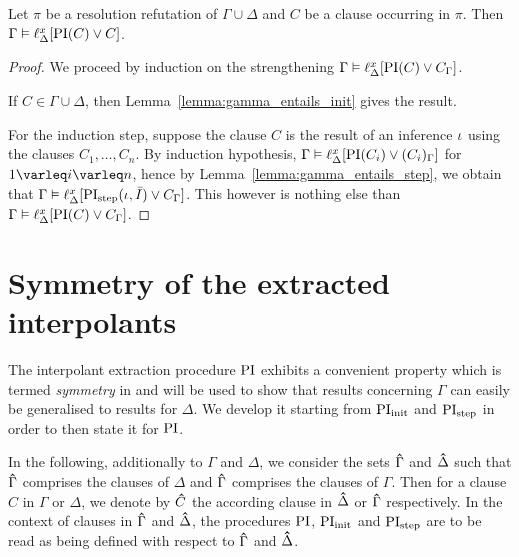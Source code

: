 \begin{lemma}
	\label{lemma:gamma_entails_lifted_interpolant}
	Let $\pi$ be a resolution refutation of $\Gamma \cup \Delta$ and $C$ be a clause occurring in $\pi$.
	Then $\Gamma \entails \lifdelta{\PI(C) \lor\nolinebreak C}$.
\end{lemma}
\begin{proof}
	We proceed by induction on the strengthening
	$\Gamma \entails \lifdelta{\PI(C) \lor\nolinebreak C_\Gamma}$.

	If $C \in \Gamma\cup\Delta$, then Lemma~\ref{lemma:gamma_entails_init} gives the result.

	For the induction step, suppose the clause $C$ is the result of an inference $\iota$ using the clauses $C_1, \dots, C_n$.
	By induction hypothesis, $\Gamma \entails \lifdelta{\PI(C_i) \lor\nolinebreak (C_i)_\Gamma}$ for $1\varleq i\varleq n$, hence
	by Lemma~\ref{lemma:gamma_entails_step}, we obtain that 
	$\Gamma \vDash \ell_{\Delta}^{x}[\operatorname{PI}_{\mathrm{step}}(\iota, \bar I) \lor C_\Gamma]$.
	This however is nothing else than $\Gamma \vDash \ell_{\Delta}^{x}[\operatorname{PI}(C) \lor C_\Gamma]$.
\end{proof}




\section{Symmetry of the extracted interpolants}
\label{sec:symmetry}

The interpolant extraction procedure $\operatorname{PI}$ exhibits a convenient property which is termed \emph{symmetry} in \cite[Definition 3]{interpolantStrenth} and will be used to show that results concerning $\Gamma$ can easily be generalised to results for $\Delta$.
We develop it starting from $\operatorname{PI}_{\mathrm{init}}$ and $\operatorname{PI}_{\mathrm{step}}$ in order to then state it for $\operatorname{PI}$. 

\newcommand{\primex}[1]{\ensuremath{\bhat{#1}}}

In the following, additionally to $\Gamma$ and $\Delta$, we consider the sets $\primex{\Gamma}$ and $\primex{\Delta}$ such that $\primex{\Gamma}$ comprises the clauses of $\Delta$ and $\primex{\Gamma}$ comprises the clauses of $\Gamma$. 
Then for a clause $C$ in $\Gamma$ or $\Delta$, we denote by $\primex C$ the according clause in $\primex \Delta$ or $\primex \Gamma$ respectively.
In the context of clauses in $\primex \Gamma$ and $\primex \Delta$, the procedures $\operatorname{PI}$, $\operatorname{PI}_{\mathrm{init}}$ and $\operatorname{PI}_{\mathrm{step}}$ are to be read as being defined with respect to $\primex \Gamma$ and $\primex \Delta$.



